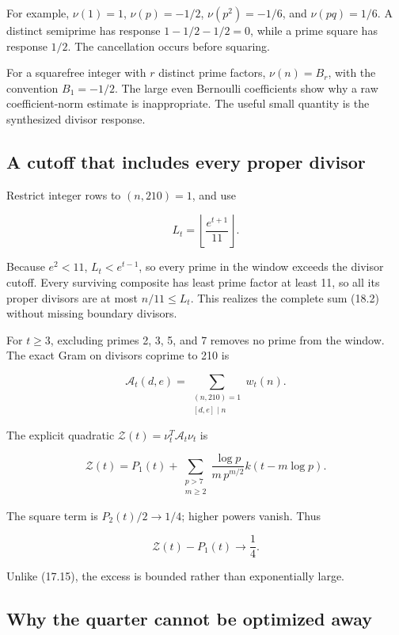 \documentclass[
  10pt,
  a4paper,
  10pt,
  oneside,
  openany]{book}
\begin{document}
For example, \(\nu(1)=1\), \(\nu(p)=-1/2\), \(\nu(p^2)=-1/6\), and
\(\nu(pq)=1/6\). A distinct semiprime has response \(1-1/2-1/2=0\),
while a prime square has response \(1/2\). The cancellation occurs
before squaring.

For a squarefree integer with \(r\) distinct prime factors,
\(\nu(n)=B_r\), with the convention \(B_1=-1/2\). The large even
Bernoulli coefficients show why a raw coefficient-norm estimate is
inappropriate. The useful small quantity is the synthesized divisor
response.

\subsection{A cutoff that includes every proper
divisor}\label{a-cutoff-that-includes-every-proper-divisor}

Restrict integer rows to \((n,210)=1\), and use

\[
L_t=\left\lfloor\frac{e^{t+1}}{11}\right\rfloor.
\tag{18.3}\label{eq:18.3}
\]

Because \(e^2<11\), \(L_t<e^{t-1}\), so every prime in the window
exceeds the divisor cutoff. Every surviving composite has least prime
factor at least 11, so all its proper divisors are at most
\(n/11\le L_t\). This realizes the complete sum (18.2) without missing
boundary divisors.

For \(t\ge3\), excluding primes 2, 3, 5, and 7 removes no prime from the
window. The exact Gram on divisors coprime to 210 is

\[
\mathcal A_t(d,e)=
\sum_{\substack{(n,210)=1\\{}[d,e]\mid n}}w_t(n).
\tag{18.4}\label{eq:18.4}
\]

The explicit quadratic \(\mathcal Z(t)=\nu_t^T\mathcal A_t\nu_t\) is

\[
\mathcal Z(t)=P_1(t)
+\sum_{\substack{p>7\\m\ge2}}
\frac{\log p}{m\,p^{m/2}}k(t-m\log p).
\tag{18.5}\label{eq:18.5}
\]

The square term is \(P_2(t)/2\to1/4\); higher powers vanish. Thus

\[
\mathcal Z(t)-P_1(t)\longrightarrow\frac14.
\tag{18.6}\label{eq:18.6}
\]

Unlike (17.15), the excess is bounded rather than exponentially large.

\subsection{Why the quarter cannot be optimized
away}\label{why-the-quarter-cannot-be-optimized-away}
\end{document}
